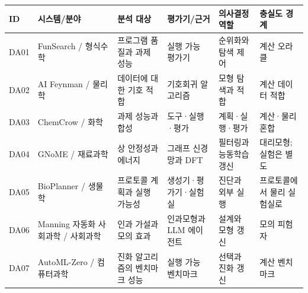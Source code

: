 \begin{tabular}{llp{.18\linewidth}p{.18\linewidth}p{.18\linewidth}p{.16\linewidth}}
\toprule
ID & 시스템/분야 & 분석 대상 & 평가기/근거 & 의사결정 역할 & 충실도 경계 \\
\midrule
DA01 & FunSearch / 형식수학 & 프로그램 품질과 과제 성능 & 실행 가능 평가기 & 순위화와 탐색 제어 & 계산 오라클 \\
DA02 & AI Feynman / 물리학 & 데이터에 대한 기호 적합 & 기호회귀 알고리즘 & 모형 탐색과 적합 & 계산 데이터 적합 \\
DA03 & ChemCrow / 화학 & 과제 성능과 합성 & 도구·실행·평가 & 계획·실행·평가 & 계산·물리 혼합 \\
DA04 & GNoME / 재료과학 & 상 안정성과 에너지 & 그래프 신경망과 DFT & 필터링과 능동학습 갱신 & 대리모형; 실험은 별도 \\
DA05 & BioPlanner / 생물학 & 프로토콜 계획과 실행 가능성 & 생성기·평가기·실험실 & 진단과 외부 실행 & 프로토콜에서 물리 실험실로 \\
DA06 & Manning 자동화 사회과학 / 사회과학 & 인과 가설과 모의 효과 & 인과모형과 LLM 에이전트 & 설계와 모형 갱신 & 모의 피험자 \\
DA07 & AutoML-Zero / 컴퓨터과학 & 진화 알고리즘의 벤치마크 성능 & 실행 가능 벤치마크 & 선택과 진화 갱신 & 계산 벤치마크 \\
\bottomrule
\end{tabular}
